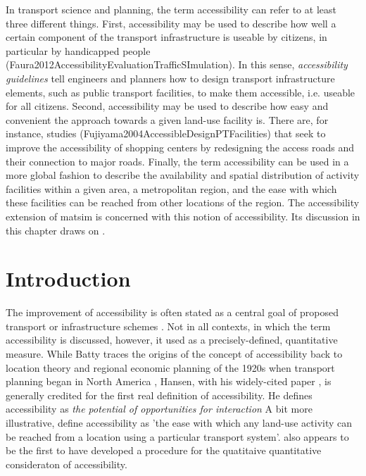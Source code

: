 In transport science and planning, the term accessibility can refer to at least three different things. 
First, accessibility may be used to describe how well a certain component of the transport infrastructure 
is useable by citizens, in particular by handicapped people (Faura2012AccessibilityEvaluationTrafficSImulation). 
In this sense, \textit{accessibility guidelines} tell engineers and planners how to design transport 
infrastructure elements, such as public transport facilities, to make them accessible, i.e. useable 
for all citizens. Second, accessibility may be used to describe how easy and convenient the approach 
towards a given land-use facility is. There are, for instance, studies (Fujiyama2004AccessibleDesignPTFacilities) 
that seek to improve the accessibility of shopping centers by redesigning the access roads and their 
connection to major roads. Finally, the term accessibility can be used in a more global fashion to 
describe the availability and spatial distribution of activity facilities within a given area, \eg a 
metropolitan region, and the ease with which these facilities can be reached from other locations of 
the region. The accessibility extension of \gls{matsim} is concerned with this notion of accessibility. 
Its discussion in this chapter draws on \citet{NicolaiNagel2012HiResAccessibilityMethodInBook}.



\section{Introduction}
The improvement of accessibility is often stated as a central goal of proposed transport or infrastructure 
schemes \citep{GeursEtAl2012AccessibilityTransportIntroduction}. Not in all contexts, in which the term 
accessibility is discussed, however, it used as a precisely-defined, quantitative measure. While Batty 
\citep{Batty2009} traces the origins of the concept of accessibility back to location theory and regional 
economic planning of the 1920s when transport planning began in North America \citep{GeursEtAl2012AccessibilityTransportIntroduction}, 
Hansen, with his widely-cited paper \citep{Hansen1959}, is generally credited for the first real 
definition of accessibility. He defines accessibility as \textit{the potential of opportunities for interaction} 
A bit more illustrative, \citet{DalviMartin1976...} define accessibility as 'the ease with which any 
land-use activity can be reached from a location using a particular transport system'. \citet{Hansen1959} 
also appears to be the first to have developed a procedure for the quatitaive quantitative consideraton of 
accessibility.

